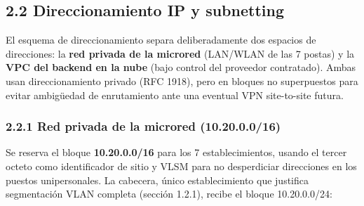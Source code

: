 \documentclass[11pt,a4paper]{article}
\begin{document}
\subsection{2.2 Direccionamiento IP y subnetting}\label{direccionamiento-ip-y-subnetting}

El esquema de direccionamiento separa deliberadamente dos espacios de direcciones: la \textbf{red privada de la microred} (LAN/WLAN de las 7 postas) y la \textbf{VPC del backend en la nube} (bajo control del proveedor contratado). Ambas usan direccionamiento privado (RFC 1918), pero en bloques no superpuestos para evitar ambigüedad de enrutamiento ante una eventual VPN site-to-site futura.

\subsubsection{2.2.1 Red privada de la microred (10.20.0.0/16)}\label{red-privada-de-la-microred-10.20.0.016}

Se reserva el bloque \textbf{10.20.0.0/16} para los 7 establecimientos, usando el tercer octeto como identificador de sitio y VLSM para no desperdiciar direcciones en los puestos unipersonales. La cabecera, único establecimiento que justifica segmentación VLAN completa (sección 1.2.1), recibe el bloque 10.20.0.0/24:
\end{document}
